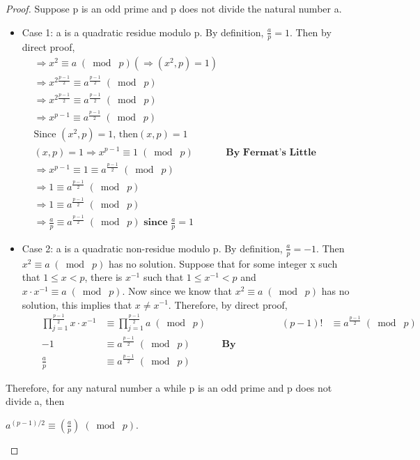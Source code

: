 \documentclass{article}
\begin{document}
\begin{proof}
Suppose p is an odd prime and p does not divide the natural number a.
\begin{itemize}
    \item Case 1: a is a quadratic residue modulo p. By definition, $\frac{a}{p} = 1$. Then by direct proof,
    \begin{align*}
        &\Longrightarrow x^2 \equiv a \;(\bmod\; p) (\Longrightarrow (x^2, p) = 1)&\\
        &\Longrightarrow x^{2\frac{p-1}{2}} \equiv a^{\frac{p-1}{2}} \;(\bmod\; p)&\\
        &\Longrightarrow x^{2\frac{p-1}{2}} \equiv a^{\frac{p-1}{2}} \;(\bmod\; p)&\\
        &\Longrightarrow x^{p-1} \equiv a^{\frac{p-1}{2}} \;(\bmod\; p)&\\
        &\text{Since $(x^2, p) = 1$, then} (x, p) = 1&\\
        &(x, p) = 1 \Longrightarrow x^{p-1} \equiv 1 \;(\bmod\; p)& \textbf{By Fermat's Little Theorem}\\
        &\Longrightarrow x^{p-1} \equiv 1 \equiv a^{\frac{p-1}{2}} \;(\bmod\; p)&\\
        &\Longrightarrow 1 \equiv a^{\frac{p-1}{2}} \;(\bmod\; p)&\\
        &\Longrightarrow 1 \equiv a^{\frac{p-1}{2}} \;(\bmod\; p)&\\
        &\Longrightarrow \frac{a}{p} \equiv a^{\frac{p-1}{2}} \;(\bmod\; p) \textbf{  since $\frac{a}{p} = 1$}&
    \end{align*}
    \item Case 2: a is a quadratic non-residue modulo p. By definition, $\frac{a}{p} = -1$. Then $x^2 \equiv a \;(\bmod\; p)$ has no solution. Suppose that for some integer x such that $1 \leq x < p$, there is $x^{-1}$ such that $1 \leq x^{-1} < p$ and $x \cdot x^{-1} \equiv a \;(\bmod\; p)$. Now since we know that $x^2 \equiv a \;(\bmod\; p)$ has no solution, this implies that $x \neq x^{-1}$. Therefore, by direct proof,
    \begin{align*}
        &&\prod_{j=1}^{\frac{p-1}{2}} x \cdot x^{-1}& \equiv \prod_{j=1}^{\frac{p-1}{2}} a \;(\bmod\; p)&&
        &&(p-1)! & \equiv a^{\frac{p-1}{2}} \;(\bmod\; p)&&\\
        &&-1 & \equiv a^{\frac{p-1}{2}} \;(\bmod\; p)&&\textbf{By Wilson's Theorem}\\
        &&\frac{a}{p} &\equiv a^{\frac{p-1}{2}} \;(\bmod\; p)&&
    \end{align*}
\end{itemize}
Therefore, for any natural number a while p is an odd prime and p does not divide a, then 
\begin{center}
    $a^{(p-1)/2} \equiv (\frac{a}{p}) \;(\bmod\; p)$.
\end{center}
\end{proof}
\end{document}
